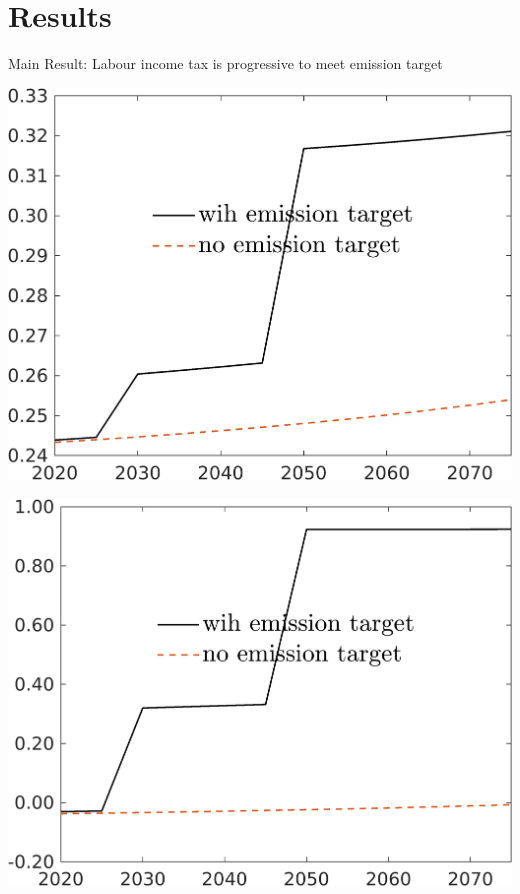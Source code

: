 \documentclass[11pt,aspectratio=169]{beamer}
\begin{document}
\section{Results}
\begin{frame}{Main Result: Labour income tax is progressive to meet emission target}
			\centering
	\begin{minipage}[]{0.32\textwidth}
\includegraphics[width=1\textwidth]{../codding_model/own_basedOnFried/optimalPol_elastS_DisuSci/figures/all_1705/taul_TargetCompOPT_T_NoTaus_spillover0_sep1_BN0_ineq1_red0_etaa0.79_lgd1.png}
	\end{minipage}
	\begin{minipage}[]{0.32\textwidth}
	\includegraphics[width=1\textwidth]{../codding_model/own_basedOnFried/optimalPol_elastS_DisuSci/figures/all_1705/tauf_TargetCompOPT_T_NoTaus_spillover0_sep1_BN0_ineq1_red0_etaa0.79_lgd1.png}

\end{minipage}
\end{frame}
\end{document}
